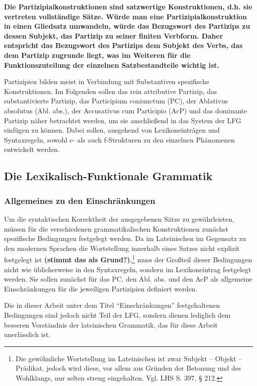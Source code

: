 \documentclass[12pt,a4paper]{article}
\begin{document}
\textbf{Die Partizipialkonstruktionen sind satzwertige Konstruktionen, d.h. sie vertreten vollständige Sätze. Würde man eine Partizipialkonstruktion in einen Gliedsatz umwandeln, würde das Bezugswort des Partizips zu dessen Subjekt, das Partizip zu seiner finiten Verbform. Daher entspricht das Bezugswort des Partizips dem Subjekt des Verbs, das dem Partizip zugrunde liegt, was im Weiteren für die Funktionszuteilung der einzelnen Satzbestandteile wichtig ist.}

Partizipien bilden meist in Verbindung mit Substantiven spezifische Konstruktionen. Im Folgenden sollen das rein attributive Partizip, das substantivierte Partizip, das Participium coniunctum (PC), der Ablativus absolutus (Abl. abs.), der Accusativus cum Participio (AcP) und das dominante Partizip näher betrachtet werden, um sie anschließend in das System der LFG einfügen zu können. Dabei sollen, ausgehend von Lexikoneinträgen und Syntaxregeln, sowohl c- als auch f-Strukturen zu den einzelnen Phänomenen entwickelt werden.
\subsection{Die Lexikalisch-Funktionale Grammatik}
\subsubsection{Allgemeines zu den Einschränkungen}
Um die syntaktischen Korrektheit der ausgegebenen Sätze zu gewährleisten, müssen für die verschiedenen grammatikalischen Konstruktionen zunächst spezifische Bedingungen festgelegt werden.
Da im Lateinischen im Gegensatz zu den modernen Sprachen die Wortstellung innerhalb eines Satzes nicht explizit festgelegt ist \textbf{(stimmt das als Grund?)},\footnote{Die gewöhnliche Wortstellung im Lateinischen ist zwar Subjekt – Objekt – Prädikat, jedoch wird diese, vor allem aus Gründen der Betonung und des Wohlklangs, nur selten streng eingehalten. Vgl. LHS S. 397, § 212.} muss der Großteil dieser Bedingungen nicht wie üblicherweise in den Syntaxregeln, sondern im Lexikoneintrag festgelegt werden. Sie sollen zunächst für das PC, den Abl. abs. und den AcP als allgemeine Einschränkungen für die jeweiligen Partizipien definiert werden.

Die in dieser Arbeit unter dem Titel ``Einschränkungen'' festgehaltenen Bedingungen sind jedoch nicht Teil der LFG, sondern dienen lediglich dem besseren Verständnis der lateinischen Grammatik, das für diese Arbeit unerlässlich ist.
\end{document}
